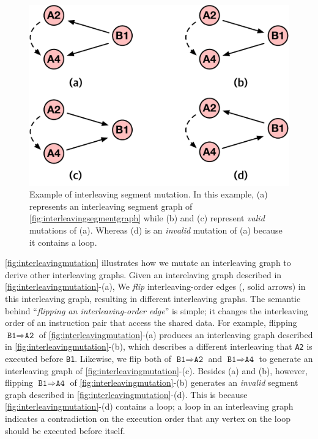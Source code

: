 \begin{figure}[t]
  \centering
  \includegraphics[width=0.7\linewidth]{fig/interleavingmutation.pdf}
  \caption{Example of interleaving segment mutation. In this example,
    (a) represents an interleaving segment graph of
    \autoref{fig:interleavingsegmentgraph} while (b) and (c) represent
    \textit{valid} mutations of (a). Whereas (d) is an
    \textit{invalid} mutation of (a) because it contains a loop.}
  \label{fig:interleavingmutation}
\end{figure}
%
\autoref{fig:interleavingmutation} illustrates how we mutate an
interleaving graph to derive other interleaving graphs.
%
Given an interelaving graph described in
\autoref{fig:interleavingmutation}-(a), We \textit{flip}
interleaving-order edges (\ie, solid arrows) in this interleaving
graph, resulting in different interleaving graphs.
%
The semantic behind ``\textit{flipping an interleaving-order edge}''
is simple; it changes the interleaving order of an instruction pair
that access the shared data.
%
For example, flipping $\texttt{B1} \Rightarrow \texttt{A2}$ of
\autoref{fig:interleavingmutation}-(a) produces an interleaving graph
described in \autoref{fig:interleavingmutation}-(b), which describes a
different interleaving that \texttt{A2} is executed before
\texttt{B1}.
%
Likewise, we flip both of $\texttt{B1} \Rightarrow \texttt{A2}$ and
$\texttt{B1} \Rightarrow \texttt{A4}$ to generate an interleaving
graph of \autoref{fig:interleavingmutation}-(c).
%
Besides (a) and (b), however, flipping
$\texttt{B1} \Rightarrow \texttt{A4}$ of
\autoref{fig:interleavingmutation}-(b) generates an \textit{invalid}
segment graph described in \autoref{fig:interleavingmutation}-(d).
%
This is because \autoref{fig:interleavingmutation}-(d) contains a
loop; a loop in an interleaving graph indicates a contradiction on the
execution order that any vertex on the loop should be executed before
itself.




